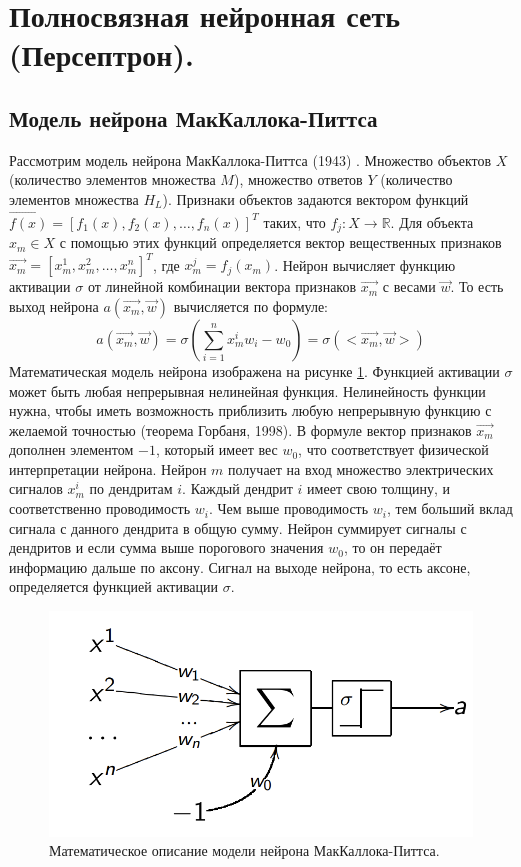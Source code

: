 \section{Полносвязная нейронная сеть (Персептрон).}

\subsection{Модель нейрона МакКаллока-Питтса}

Рассмотрим модель нейрона МакКаллока-Питтса (1943) \cite{ModelMcCullochPitts}. Множество объектов $X$ (количество элементов множества $M$), множество ответов $Y$ (количество элементов множества $H_L$). Признаки объектов задаются вектором функций $\overrightarrow{f(x)} = [f_1(x), f_2(x), \dots, f_n(x)]^T$ таких, что $f_j: X \rightarrow \mathbb{R}$. Для объекта $x_m \in X$ с помощью этих функций определяется вектор вещественных признаков $\overrightarrow{x_m} = [x_m^1, x_m^2, \dots, x_m^n]^T$, где $x_m^j = f_j (x_m)$. Нейрон вычисляет функцию активации $\sigma$ от линейной комбинации вектора признаков $\overrightarrow{x_m}$ с весами $\overrightarrow{w}$. То есть выход нейрона $a(\overrightarrow{x_m}, \overrightarrow{w})$ вычисляется по формуле:
$$
	a(\overrightarrow{x_m}, \overrightarrow{w}) = \sigma(\sum_{i = 1}^{n} x_m^i w_i - w_0) = \sigma (<\overrightarrow{x_m}, \overrightarrow{w}>)
$$
Математическая модель нейрона изображена на рисунке \ref{img:McCullochPittsModel}. Функцией активации $\sigma$ может быть любая непрерывная нелинейная функция. Нелинейность функции нужна, чтобы иметь возможность приблизить любую непрерывную функцию с желаемой точностью (теорема Горбаня, 1998). В формуле вектор признаков $\overrightarrow{x_m}$ дополнен элементом $-1$, который имеет вес $w_0$, что соответствует физической интерпретации нейрона. Нейрон $m$ получает на вход множество электрических сигналов $x_m^i$ по дендритам $i$. Каждый дендрит $i$ имеет свою толщину, и соответственно проводимость $w_i$. Чем выше проводимость $w_i$, тем больший вклад сигнала с данного дендрита в общую сумму. Нейрон суммирует сигналы с дендритов и если сумма выше порогового значения $w_0$, то он передаёт информацию дальше по аксону. Сигнал на выходе нейрона, то есть аксоне, определяется функцией активации $\sigma$.

\begin{figure}[h]
	\centering
	\includegraphics[width=0.4\linewidth]{chapters/neural/images/neuron1.png}
	\caption{Математическое описание модели нейрона МакКаллока-Питтса.}
	\label{img:McCullochPittsModel}
\end{figure}

